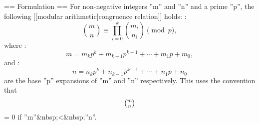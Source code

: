 == Formulation ==
For non-negative integers ''m'' and ''n'' and a prime ''p'', the following [[modular arithmetic|congruence relation]] holds:
:$$\binom{m}{n}\equiv\prod_{i=0}^k\binom{m_i}{n_i}\pmod p,$$
where
:$$m=m_kp^k+m_{k-1}p^{k-1}+\cdots +m_1p+m_0,$$
and
:$$n=n_kp^k+n_{k-1}p^{k-1}+\cdots +n_1p+n_0$$
are the base ''p'' expansions of ''m'' and ''n'' respectively.  This uses the convention that $$\tbinom{m}{n}$$ = 0 if ''m''&nbsp;<&nbsp;''n''.
